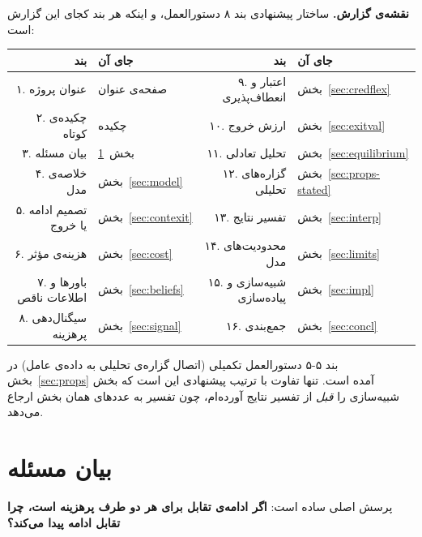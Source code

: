 \documentclass[12pt,a4paper]{article}
\begin{document}
\vspace{6pt}
\begin{keybox}
\textbf{نقشه‌ی گزارش.} ساختار پیشنهادی بند ۸ دستورالعمل، و اینکه هر بند کجای
این گزارش است:

\vspace{3pt}
\centering\small
\begin{tabular}{@{}rl@{\qquad}rl@{}}
\toprule
بند & جای آن & بند & جای آن\\
\midrule
۱. عنوان پروژه          & صفحه‌ی عنوان        & ۹. اعتبار و انعطاف‌پذیری & بخش~\ref{sec:credflex}\\
۲. چکیده‌ی کوتاه         & چکیده               & ۱۰. ارزش خروج            & بخش~\ref{sec:exitval}\\
۳. بیان مسئله           & بخش~\ref{sec:problem}  & ۱۱. تحلیل تعادلی      & بخش~\ref{sec:equilibrium}\\
۴. خلاصه‌ی مدل           & بخش~\ref{sec:model}    & ۱۲. گزاره‌های تحلیلی   & بخش~\ref{sec:props-stated}\\
۵. تصمیم ادامه یا خروج  & بخش~\ref{sec:contexit} & ۱۳. تفسیر نتایج       & بخش~\ref{sec:interp}\\
۶. هزینه‌ی مؤثر          & بخش~\ref{sec:cost}     & ۱۴. محدودیت‌های مدل    & بخش~\ref{sec:limits}\\
۷. باورها و اطلاعات ناقص& بخش~\ref{sec:beliefs}  & ۱۵. شبیه‌سازی و پیاده‌سازی & بخش~\ref{sec:impl}\\
۸. سیگنال‌دهی پرهزینه    & بخش~\ref{sec:signal}   & ۱۶. جمع‌بندی           & بخش~\ref{sec:concl}\\
\bottomrule
\end{tabular}

\vspace{4pt}
\raggedright\small
بند ۵-۵ دستورالعمل تکمیلی (اتصال گزاره‌ی تحلیلی به داده‌ی عامل) در
بخش~\ref{sec:props} آمده است. تنها تفاوت با ترتیب پیشنهادی این است که بخش
شبیه‌سازی را \emph{قبل} از تفسیر نتایج آورده‌ام، چون تفسیر به عددهای همان بخش
ارجاع می‌دهد.
\end{keybox}

\newpage

\section{بیان مسئله}\label{sec:problem}

پرسش اصلی ساده است: \textbf{اگر ادامه‌ی تقابل برای هر دو طرف پرهزینه است، چرا
تقابل ادامه پیدا می‌کند؟}
\end{document}
